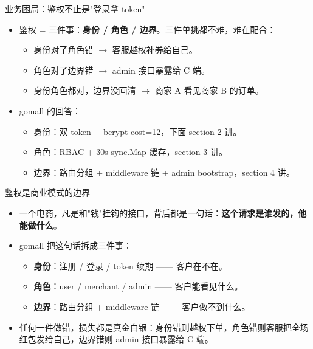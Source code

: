 \documentclass[aspectratio=169,11pt]{beamer}
\begin{document}
\begin{frame}[shrink]{业务困局：鉴权不止是"登录拿 token"}
\begin{itemize}
  \item 鉴权 = 三件事：\textbf{身份 / 角色 / 边界}。三件单挑都不难，难在配合：
  \begin{itemize}
    \item 身份对了角色错 \(\to\) 客服越权补券给自己。
    \item 角色对了边界错 \(\to\) admin 接口暴露给 C 端。
    \item 身份角色都对，边界没画清 \(\to\) 商家 A 看见商家 B 的订单。
  \end{itemize}
  \item gomall 的回答：
  \begin{itemize}
    \item 身份：双 token + bcrypt cost=12，下面 section 2 讲。
    \item 角色：RBAC + 30s sync.Map 缓存，section 3 讲。
    \item 边界：路由分组 + middleware 链 + admin bootstrap，section 4 讲。
  \end{itemize}
\end{itemize}
\end{frame}

\begin{frame}[shrink]{鉴权是商业模式的边界}
\begin{itemize}
  \item 一个电商，凡是和"钱"挂钩的接口，背后都是一句话：\textbf{这个请求是谁发的，他能做什么}。
  \item gomall 把这句话拆成三件事：
  \begin{itemize}
    \item \textbf{身份}：注册 / 登录 / token 续期 —— 客户在不在。
    \item \textbf{角色}：user / merchant / admin —— 客户能看见什么。
    \item \textbf{边界}：路由分组 + middleware 链 —— 客户做不到什么。
  \end{itemize}
  \item 任何一件做错，损失都是真金白银：身份错则越权下单，角色错则客服把全场红包发给自己，边界错则 admin 接口暴露给 C 端。
\end{itemize}
\end{frame}
\end{document}
